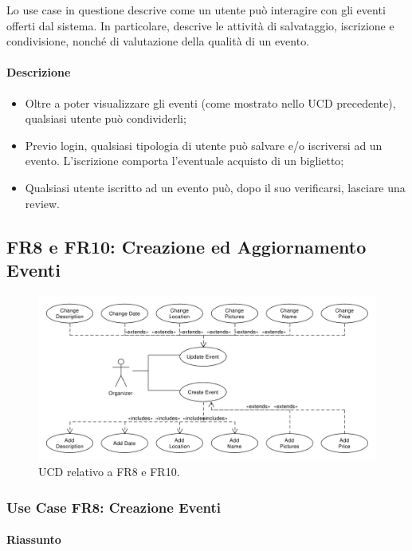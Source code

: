 \documentclass[9pt]{extarticle}
\begin{document}
Lo use case in questione descrive come un utente può interagire con gli eventi offerti dal sistema. In particolare, descrive le attività di salvataggio, iscrizione e condivisione, nonché di valutazione della qualità di un evento.

\paragraph{Descrizione}

\begin{itemize}
	\item Oltre a poter visualizzare gli eventi (come mostrato nello UCD precedente), qualsiasi utente può condividerli;
	\item Previo login, qualsiasi tipologia di utente può salvare e/o iscriversi ad un evento. L'iscrizione comporta l'eventuale acquisto di un biglietto;
	\item Qualsiasi utente iscritto ad un evento può, dopo il suo verificarsi, lasciare una review.
\end{itemize}


\subsection{FR8 e FR10: Creazione ed Aggiornamento Eventi}

\begin{figure}[!htb]
	\centering
	\includegraphics[width=\linewidth]{./images/FR8-10.pdf}
	\caption{UCD relativo a FR8 e FR10.}
	\label{fig:UCD_FR8-10}
\end{figure}

\subsubsection*{Use Case FR8: Creazione Eventi}

\paragraph{Riassunto}
\end{document}
